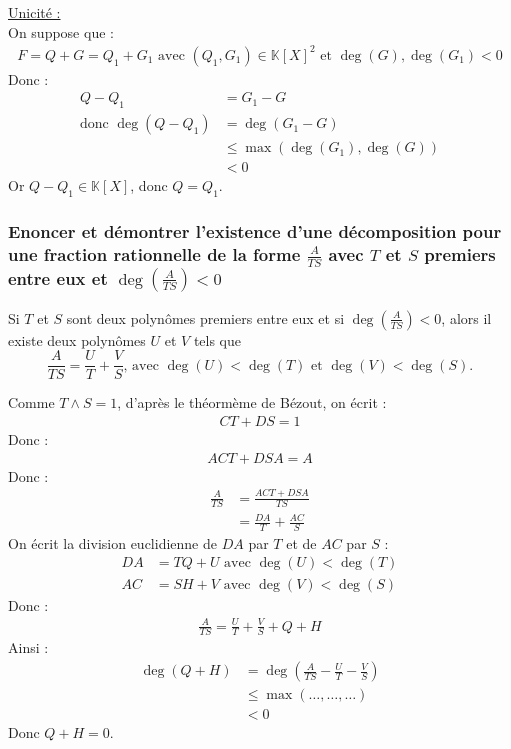\documentclass[titlepage, twoside]{report}
\begin{document}
\noindent \underline{Unicité :} \\
On suppose que : 
\begin{align*}
    F = Q + G = Q_1 + G_1 \text{ avec } (Q_1, G_1) \in \mathbb{K}[X]^2 \text{ et } \deg(G), \deg(G_1) < 0
\end{align*}
Donc :
\begin{align*}
    Q - Q_1 &= G_1 - G \\
    \text{donc } \deg(Q - Q_1) &= \deg(G_1 - G) \\
    &\leq \max(\deg(G_1), \deg(G)) \\
    &< 0
\end{align*}
Or $Q - Q_1 \in \mathbb{K}[X]$, donc $Q = Q_1$. 

\subsubsection{Enoncer et démontrer l'existence d'une décomposition pour une fraction rationnelle de la forme $\frac{A}{TS}$ avec $T$ et $S$ premiers entre eux et $\deg \left( \frac{A}{TS} \right) < 0$}
\begin{tcolorbox}[title=Théorème 17.31, title filled=false, colframe=orange, colback=orange!10!white]
    Si $T$ et $S$ sont deux polynômes premiers entre eux et si $\deg \left( \frac{A}{TS} \right) < 0$, alors il existe deux polynômes $U$ et $V$ tels que
    $$\frac{A}{TS} = \frac{U}{T} + \frac{V}{S} \text{, avec } \deg(U) < \deg(T) \text{ et } \deg(V) < \deg(S).$$
\end{tcolorbox}

\noindent Comme $T \wedge S = 1$, d'après le théormème de Bézout, on écrit : 
\begin{align*}
    CT + DS = 1
\end{align*}
Donc : 
\begin{align*}
    ACT + DSA = A
\end{align*}
Donc : 
\begin{align*}
    \frac{A}{TS} &= \frac{ACT + DSA}{TS} \\
    &= \frac{DA}{T} + \frac{AC}{S}
\end{align*}
On écrit la division euclidienne de $DA$ par $T$ et de $AC$ par $S$ :
\begin{align*}
    DA &= TQ + U \text{ avec } \deg(U) < \deg(T) \\
    AC &= SH + V \text{ avec } \deg(V) < \deg(S)
\end{align*}
Donc :
\begin{align*}
    \frac{A}{TS} = \frac{U}{T} + \frac{V}{S} + Q + H
\end{align*}
Ainsi : 
\begin{align*}
    \deg (Q + H) &= \deg \left( \frac{A}{TS} - \frac{U}{T} - \frac{V}{S} \right) \\
    &\leq \max(\ldots, \ldots, \ldots) \\
    &< 0
\end{align*}
Donc $Q + H = 0$. 
\end{document}

